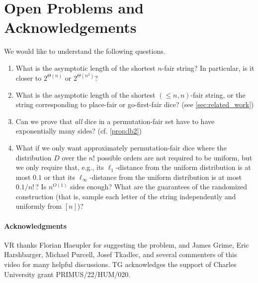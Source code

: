 \documentclass{article}
\begin{document}
\section{Open Problems and Acknowledgements}
\label{sec:open}

We would like to understand the following questions. 

\begin{enumerate}
\item What is the asymptotic length of the shortest $n$-fair string? In particular, is it closer to $2^{\Theta(n)}$ or $2^{\Theta(n^2)}$? 
\item What is the asymptotic length of the shortest $(\le n, n)$-fair string, or the string corresponding to place-fair or go-first-fair dice? (see \cref{sec:related_work})
\item Can we prove that \emph{all} dice in a permutation-fair set have to have exponentially many sides? (cf. \cref{prop:lb2}) 
\item What if we only want approximately permutation-fair dice where the distribution $D$ over the $n!$ possible orders are not required to be uniform, but we only require that, e.g., its $\ell_1$-distance from the uniform distribution is at most $0.1$ or that its $\ell_\infty$-distance from the uniform distribution is at most $0.1 / n!\,$? Is $n^{O(1)}$ sides enough? What are the guarantees of the randomized construction (that is, sample each letter of the string independently and uniformly from $[n]$)? 
\end{enumerate}


\paragraph{Acknowledgments}
VR thanks Florian Haeupler for suggesting the problem, and James Grime, Eric Harshbarger, Michael Purcell, Josef Tkadlec, and several commenters of this video \cite{polylog_webpage} for many helpful discussions. 
TG acknowledges the support of Charles University grant PRIMUS/22/HUM/020.



\end{document}
